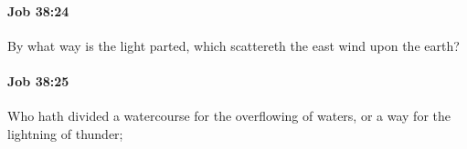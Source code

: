 		\paragraph{Job 38:24} %
			\label{JOB-38-24}

			By what way is the light parted, which scattereth the east wind upon the earth?


		\paragraph{Job 38:25} %
			\label{JOB-38-25}

			Who hath divided a watercourse for the overflowing of waters, or a way for the lightning of thunder;


